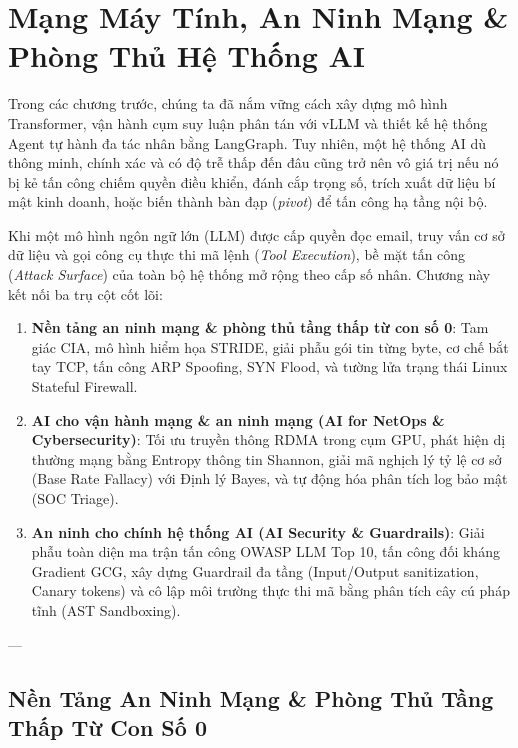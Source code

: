 
\chapter{Mạng Máy Tính, An Ninh Mạng \& Phòng Thủ Hệ Thống AI}
\label{ch:ai-security-guardrails}

Trong các chương trước, chúng ta đã nắm vững cách xây dựng mô hình Transformer, vận hành cụm suy luận phân tán với vLLM và thiết kế hệ thống Agent tự hành đa tác nhân bằng LangGraph. Tuy nhiên, một hệ thống AI dù thông minh, chính xác và có độ trễ thấp đến đâu cũng trở nên vô giá trị nếu nó bị kẻ tấn công chiếm quyền điều khiển, đánh cắp trọng số, trích xuất dữ liệu bí mật kinh doanh, hoặc biến thành bàn đạp (\textit{pivot}) để tấn công hạ tầng nội bộ.

Khi một mô hình ngôn ngữ lớn (LLM) được cấp quyền đọc email, truy vấn cơ sở dữ liệu và gọi công cụ thực thi mã lệnh (\textit{Tool Execution}), bề mặt tấn công (\textit{Attack Surface}) của toàn bộ hệ thống mở rộng theo cấp số nhân. Chương này kết nối ba trụ cột cốt lõi:
\begin{enumerate}
  \item \textbf{Nền tảng an ninh mạng \& phòng thủ tầng thấp từ con số 0}: Tam giác CIA, mô hình hiểm họa STRIDE, giải phẫu gói tin từng byte, cơ chế bắt tay TCP, tấn công ARP Spoofing, SYN Flood, và tường lửa trạng thái Linux Stateful Firewall.
  \item \textbf{AI cho vận hành mạng \& an ninh mạng (AI for NetOps \& Cybersecurity)}: Tối ưu truyền thông RDMA trong cụm GPU, phát hiện dị thường mạng bằng Entropy thông tin Shannon, giải mã nghịch lý tỷ lệ cơ sở (Base Rate Fallacy) với Định lý Bayes, và tự động hóa phân tích log bảo mật (SOC Triage).
  \item \textbf{An ninh cho chính hệ thống AI (AI Security \& Guardrails)}: Giải phẫu toàn diện ma trận tấn công OWASP LLM Top 10, tấn công đối kháng Gradient GCG, xây dựng Guardrail đa tầng (Input/Output sanitization, Canary tokens) và cô lập môi trường thực thi mã bằng phân tích cây cú pháp tĩnh (AST Sandboxing).
\end{enumerate}

---

\section{Nền Tảng An Ninh Mạng \& Phòng Thủ Tầng Thấp Từ Con Số 0}
\label{sec:ch12-security-foundations}

